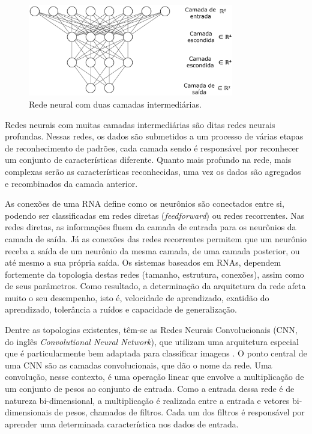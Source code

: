 \begin{figure}[H]
 \centering
  \includegraphics[width=0.8\textwidth]{./fig/nn}
 \caption{Rede neural com duas camadas intermediárias.}
 \label{fig:redeneural}
\end{figure}

Redes neurais com muitas camadas intermediárias são ditas redes neurais profundas. Nessas redes, os dados são submetidos a um processo de várias etapas de reconhecimento de padrões, cada camada sendo é responsável por reconhecer um conjunto de características diferente. Quanto mais profundo na rede, mais complexas serão as características reconhecidas, uma vez os dados são agregados e recombinados da camada anterior. 

As conexões de uma RNA define como os neurônios são conectados entre si, podendo ser classificadas em redes diretas (\textit{feedforward}) ou redes recorrentes. Nas redes diretas, as informações fluem da camada de entrada para os neurônios da camada de saída. Já as conexões das redes recorrentes permitem que um neurônio receba a saída de um neurônio da mesma camada, de uma camada posterior, ou até mesmo a sua própria saída. Os sistemas baseados em RNAs, dependem fortemente da topologia destas redes (tamanho, estrutura, conexões), assim como de seus parâmetros. Como resultado, a determinação da arquitetura da rede afeta muito o seu desempenho, isto é, velocidade de aprendizado, exatidão do aprendizado, tolerância a ruídos e capacidade de generalização.

Dentre as topologias existentes, têm-se as Redes Neurais Convolucionais (CNN, do inglês \textit{Convolutional Neural Network}), que utilizam uma arquitetura especial que é particularmente bem adaptada para classificar imagens \cite{Krizhevsky12}. O ponto central de uma CNN são as camadas convolucionais, que dão o nome da rede. Uma convolução, nesse contexto, é uma operação linear que envolve a multiplicação de um conjunto de pesos ao conjunto de entrada. Como a entrada dessa rede é de natureza bi-dimensional, a multiplicação é realizada entre a entrada e vetores bi-dimensionais de pesos, chamados de filtros. Cada um dos filtros é responsável por aprender uma determinada característica nos dados de entrada.

